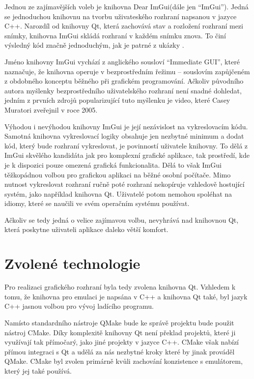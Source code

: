Jednou ze zajímavějších voleb je knihovna Dear ImGui\todocite (dále jen ``ImGui''). Jedná se jednoduchou knihovnu na tvorbu uživateského rozhraní napsanou v jazyce C++. Narozdíl od knihovny Qt, která zachovává stav a rozložení rozhraní mezi snímky, knihovna ImGui skládá rozhraní v každém snímku znova. To činí výsledný kód značně jednoduchým, jak je patrné z ukázky .

Jméno knihovny ImGui vychází z anglického sousloví ``Immediate GUI'', které naznačuje, že knihovna operuje v bezprostředním řežimu -- souslovím zapůjčeném z obdobného konceptu běžného při grafickém programování. Ačkoliv původního autora myšlenky bezprostředního uživatelského rozhraní není snadné dohledat, jedním z prvních zdrojů popularizující tuto myšlenku je video, které Casey Muratori zveřejnil v roce 2005\todocite.


Výhodou i nevýhodou knihovny ImGui je její nezávislost na vykreslovacím kódu. Samotná knihovna vykreslovací logiky obsahuje jen nezbytné minimum a dodat kód, který bude rozhraní vykreslovat, je povinností uživatele knihovny. To dělá z ImGui skvělého kandidáta jak pro komplexní grafické aplikace, tak prostředí, kde je k dispozici pouze omezená grafická funkcionalita. Dělá to však ImGui těžkopádnou volbou pro grafickou aplikaci na běžné osobní počítače. Mimo nutnost vykreslovat rozhraní ručně poté rozhraní nekopíruje vzhledově hostující systém, jako například knihovna Qt. Uživatelé potom nemohou spoléhat na idiomy, které se naučili ve svém operačním systému používat.

Ačkoliv se tedy jedná o velice zajímavou volbu, nevyhrává nad knihovnou Qt, která poskytne uživateli aplikace daleko větší komfort.

\section{Zvolené technologie}

Pro realizaci grafického rozhraní byla tedy zvolena knihovna Qt. Vzhledem k tomu, že knihovna pro emulaci je napsána v C++ a knihovna Qt také, byl jazyk C++ jasnou volbou pro vývoj ladícího programu.

Namísto standardního nástroje QMake bude ke správě projektu bude použit nástroj CMake. Díky komplexitě knihovny Qt není překlad projektů, které ji využívají tak přímočarý, jako jiné projekty v jazyce C++. CMake však nabízí přímou integraci s Qt a udělá za nás nezbytné kroky které by jinak prováděl QMake. CMake byl zvolen primárně kvůli zachování konzistence s emulátorem, který jej také používá.

